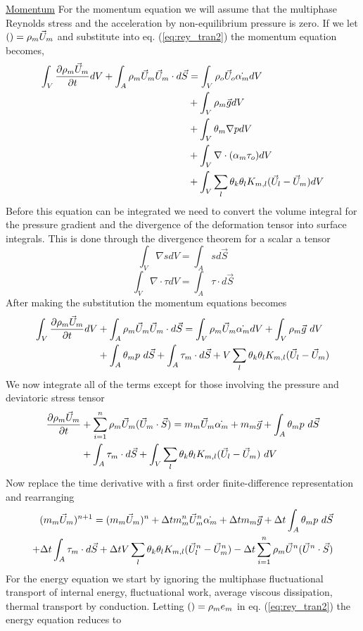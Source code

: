 \documentclass[fleqn]{article}
\begin{document}
{\underline{Momentum}
For the momentum equation we will assume that the multiphase Reynolds stress
and the acceleration by non-equilibrium pressure is zero.  If we let $()
= \rhom \um$ and substitute into eq. (\ref{eq:rey_tran2}) the momentum
equation becomes,
%
\begin{align*}
        \int_{V}\pd{\rhom \um }{t}dV + \int_{A} \rhom \um \um \cdot d\vec{S} 
&   =   \int_{V}\rho_o \vec{U}_o \dot{\alpham}dV \\
&   +   \int_{V}\rhom \vec{g}dV\\
&   +   \int_{V}\theta_m\nabla{p}dV\\
&   +   \int_{V}\nabla \cdot(\alpham \tau_o)dV\\
&   +   \int_{V}\sum_{l} \theta_k \theta_l K_{m,l}(\vec{U}_l - \um)dV
\end{align*}
%
Before this equation can be integrated we need to convert  the volume integral
for the pressure gradient and the divergence of the deformation tensor into
surface integrals.  This is done through the divergence theorem for a scalar
a tensor 
%
\[\int_{V} \nabla{s} dV = \int_A s d\vec{S}\]
\[\int_{V} \nabla \cdot{\tau} dV = \int_A \tau \cdot d\vec{S} \]
%
After making the substitution the momentum equations becomes\\
%
\begin{align*}
        \int_{V}\pd{\rhom\um }{t}dV &+ \int_{A} \rhom \um \um \cdot d\vec{S} 
=       \int_{V}\rhom \um \dot{\alpham}dV 
    +   \int_{V}\rhom \vec{g}~dV\\
&   +   \int_{A}\theta_{m} p~d\vec{S}
    +   \int_{A}\tau_m\cdot d\vec{S}
    +   V \sum_{l} \theta_k \theta_l K_{m,l}(\vec{U}_l - \um)
\end{align*}
%
We now integrate all of the terms except for those involving the pressure
and deviatoric stress tensor
%
\begin{align*}
\pd{\rhom\um }{t} &+ \sumarea \rhom \um (\um \cdot \vec{S}) 
=       m_m \um \dot{\alpham}
    +   m_m \vec{g}
    +   \int_{A}\theta_{m} p~d\vec{S}\\
&   +   \int_{A}\tau_m\cdot d\vec{S}
    +   \int_{V} \sum_{l} \theta_k \theta_l K_{m,l}(\vec{U}_l - \um)~dV
\end{align*}
%
Now replace the time derivative with a first order finite-difference
representation and rearranging\\
%
\begin{align}
(m_m\um)^{n+1}  = 
        (m_m\um)^{n}
    +   \delt \massnm \unm \dot{\alpham} 
    +   \delt m_m \vec{g}
    +   \delt \int_{A}\theta_{m} p~d\vec{S}\notag \\
    +   \delt \int_{A}\tau_m\cdot d\vec{S} 
    +   \delt V \sum_{l} \theta_k \theta_l K_{m,l}(\un_{l} - \unm)
    -   \delt \sumarea \rhom \un (\un \cdot \vec{S}) 
\end{align} 
For the energy equation we start by ignoring the multiphase fluctuational
transport of internal energy, fluctuational work, average viscous
dissipation, thermal transport by conduction.  Letting $() = \rhom e_m$
in eq. (\ref{eq:rey_tran2}) the energy equation reduces to \\ %

}
\end{document}
